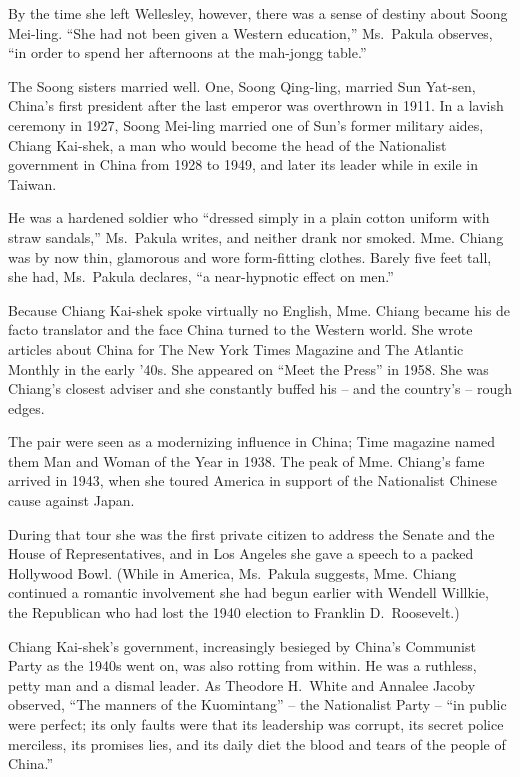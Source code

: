 ﻿\documentclass[12pt]{article}
\begin{document}
By the time she left Wellesley, however, there was a sense of destiny about Soong Mei-ling. ``She
had not been given a Western education,'' Ms.~Pakula observes, ``in order to spend her afternoons at
the mah-jongg table.''

The Soong sisters married well. One, Soong Qing-ling, married Sun Yat-sen, China's first president
after the last emperor was overthrown in 1911. In a lavish ceremony in 1927, Soong Mei-ling married
one of Sun's former military aides, Chiang Kai-shek, a man who would become the head of the
Nationalist government in China from 1928 to 1949, and later its leader while in exile in Taiwan.

He was a hardened soldier who ``dressed simply in a plain cotton uniform with straw sandals,''
Ms.~Pakula writes, and neither drank nor smoked. Mme. Chiang was by now thin, glamorous and wore
form-fitting clothes. Barely five feet tall, she had, Ms.~Pakula declares, ``a near-hypnotic effect
on men.''

Because Chiang Kai-shek spoke virtually no English, Mme. Chiang became his de facto translator and
the face China turned to the Western world. She wrote articles about China for The New York Times
Magazine and The Atlantic Monthly in the early '40s. She appeared on ``Meet the Press'' in 1958. She
was Chiang's closest adviser and she constantly buffed his -- and the country's -- rough edges.

The pair were seen as a modernizing influence in China; Time magazine named them Man and Woman of
the Year in 1938. The peak of Mme. Chiang's fame arrived in 1943, when she toured America in support
of the Nationalist Chinese cause against Japan.

During that tour she was the first private citizen to address the Senate and the House of
Representatives, and in Los Angeles she gave a speech to a packed Hollywood Bowl. (While in America,
Ms.~Pakula suggests, Mme. Chiang continued a romantic involvement she had begun earlier with Wendell
Willkie, the Republican who had lost the 1940 election to Franklin D.~Roosevelt.)

Chiang Kai-shek's government, increasingly besieged by China's Communist Party as the 1940s went on,
was also rotting from within. He was a ruthless, petty man and a dismal leader. As Theodore H.~White
and Annalee Jacoby observed, ``The manners of the Kuomintang'' -- the Nationalist Party -- ``in
public were perfect; its only faults were that its leadership was corrupt, its secret police
merciless, its promises lies, and its daily diet the blood and tears of the people of China.''
\end{document}
